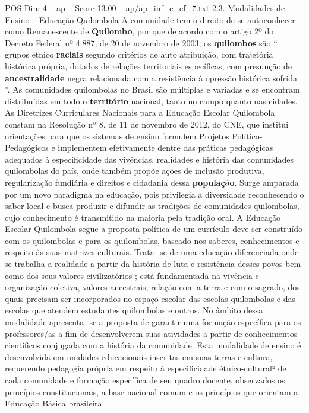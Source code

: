 \begin{textsample}{POS Dim 4 – ap – Score 13.00 – ap/ap\_inf\_e\_ef\_7.txt}  \label{ex:f4_pos_232}
2.3.
Modalidades de Ensino – Educação Quilombola A comunidade tem o direito de se autoconhecer como Remanescente de \textbf{Quilombo}, por que de acordo com o artigo 2º do Decreto Federal nº 4.887, de 20 de novembro de 2003, os \textbf{quilombos} são “ grupos étnico \textbf{raciais} segundo critérios de auto atribuição, com trajetória histórica própria, dotados de relações territoriais específicas, com presunção de \textbf{ancestralidade} negra relacionada com a resistência à opressão histórica sofrida ”.
As comunidades quilombolas no Brasil são múltiplas e variadas e se encontram distribuídas em todo o \textbf{território} nacional, tanto no campo quanto nas cidades.
As Diretrizes Curriculares Nacionais para a Educação Escolar Quilombola constam na Resolução nº 8, de 11 de novembro de 2012, do CNE, que institui orientações para que os sistemas de ensino formulem Projetos Político-Pedagógicos e implementem efetivamente dentre das práticas pedagógicas adequados à especificidade das vivências, realidades e história das comunidades quilombolas do país, onde também propõe ações de inclusão produtiva, regularização fundiária e direitos e cidadania dessa \textbf{população}.
Surge amparada por um novo paradigma na educação, pois privilegia a diversidade reconhecendo o saber local e busca produzir e difundir as tradições de comunidades quilombolas, cujo conhecimento é transmitido na maioria pela tradição oral.
A Educação Escolar Quilombola segue a proposta política de um currículo deve ser construído com os quilombolas e para os quilombolas, baseado nos saberes, conhecimentos e respeito às suas matrizes culturais.
Trata -se de uma educação diferenciada onde se trabalha a realidade a partir da história de luta e resistência desses povos bem como dos seus valores civilizatórios ; está fundamentada na vivência e organização coletiva, valores ancestrais, relação com a terra e com o sagrado, dos quais precisam ser incorporados no espaço escolar das escolas quilombolas e das escolas que atendem estudantes quilombolas e outros.
No âmbito dessa modalidade apresenta -se a proposta de garantir uma formação específica para os professores/as a fim de desenvolverem suas atividades a partir de conhecimentos científicos conjugada com a história da comunidade.
Esta modalidade de ensino é desenvolvida em unidades educacionais inscritas em suas terras e cultura, requerendo pedagogia própria em respeito à especificidade étnico-cultural² de cada comunidade e formação específica de seu quadro docente, observados os princípios constitucionais, a base nacional comum e os princípios que orientam a Educação Básica brasileira.

\end{textsample}
